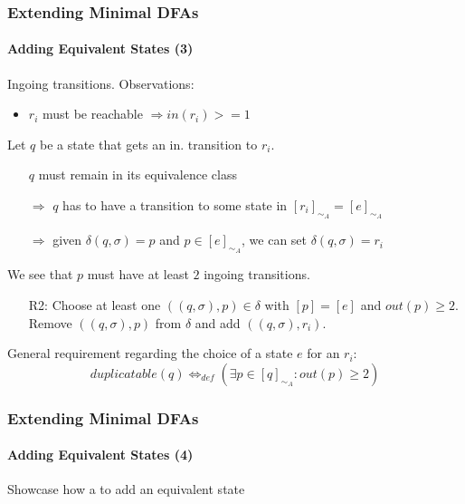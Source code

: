 \documentclass[handout,10pt]{beamer}%
\begin{document}
	\begin{frame}
		\frametitle{Extending Minimal DFAs}
		\framesubtitle{Adding Equivalent States (3)}
		
		Ingoing transitions. Observations:
		
		\vspace{0.2cm}
		\begin{itemize}
			\item $r_i$ must be reachable $\Rightarrow in(r_i) >= 1$
		\end{itemize}
	
		\vspace{0.2cm}
		Let $q$ be a state that gets an in. transition to $r_i$.
		
		\vspace{0.2cm}
		\begin{itemize}
			\item[] $q$ must remain in its equivalence class
			
			\item[$\Rightarrow$] $q$ has to have a transition to some state in $[r_i]_{\sim_A} = [e]_{\sim_A}$
			
			\item[$\Rightarrow$] given $\delta(q, \sigma) = p$ and $p \in [e]_{\sim_A}$, we can set $\delta(q, \sigma) = r_i$
		\end{itemize}
		
		\vspace{0.2cm}
		We see that $p$ must have at least $2$ ingoing transitions.
		
		\vspace{0.2cm}
		\begin{itemize}
			\item[R2:] Choose at least one $((q, \sigma), p) \in \delta$ with $[p] = [e]$ and $out(p) \geq 2$. Remove $((q, \sigma), p)$ from $\delta$ and add $((q, \sigma), r_i)$.
		\end{itemize}
	
\vspace{0.2cm}
		General requirement regarding the choice of a state $e$ for an $r_i$: 
		\[
			duplicatable(q) \Leftrightarrow_{def} (\exists p \in [q]_{\sim_A}\colon out(p) \geq 2)
		\]
	
	\end{frame}

	\begin{frame}
		\frametitle{Extending Minimal DFAs}
		\framesubtitle{Adding Equivalent States (4)}
		
		Showcase how a to add an equivalent state
	
	\end{frame}
\end{document}
